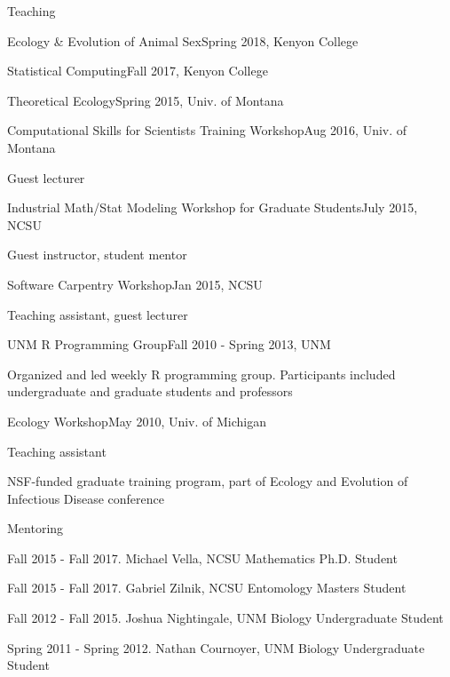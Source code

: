 \documentclass{resume} %
\begin{document}
\begin{rSection}{Teaching}
\begin{rSubsection}{Ecology \& Evolution of Animal Sex}{Spring 2018, Kenyon College}{}{}
\nullitem
\end{rSubsection}
\begin{rSubsection}{Statistical Computing}{Fall 2017, Kenyon College}{}{}
\nullitem
\end{rSubsection}
\begin{rSubsection}{Theoretical Ecology}{Spring 2015, Univ. of Montana}{}{}
\nullitem
\end{rSubsection}
\begin{rSubsection}{Computational Skills for Scientists Training Workshop}{Aug 2016, Univ. of Montana}{}{}
\item Guest lecturer
\end{rSubsection}
\begin{rSubsection}{Industrial Math/Stat Modeling Workshop for Graduate Students}{July 2015, NCSU}{}{}
\item Guest instructor, student mentor
\end{rSubsection}
\begin{rSubsection}{Software Carpentry Workshop}{Jan 2015, NCSU}{}{}
\item Teaching assistant, guest lecturer
\end{rSubsection}
\begin{rSubsection}{UNM R Programming Group}{Fall 2010 - Spring 2013, UNM}{}{}
\item Organized and led weekly R programming group. Participants included undergraduate and graduate students and professors
\end{rSubsection}
\begin{rSubsection}{Ecology Workshop}{May 2010, Univ. of Michigan}{}{}
\item Teaching assistant
\item NSF-funded graduate training program, part of Ecology and Evolution of Infectious
Disease conference
\end{rSubsection}
\end{rSection}

\begin{rSection}{Mentoring}
\item Fall 2015 - Fall 2017. Michael Vella, NCSU Mathematics Ph.D. Student
\item Fall 2015 - Fall 2017. Gabriel Zilnik, NCSU Entomology Masters Student
\item Fall 2012 - Fall 2015. Joshua Nightingale, UNM Biology Undergraduate Student
\item Spring 2011 - Spring 2012. Nathan Cournoyer, UNM Biology Undergraduate Student
\end{rSection}
\end{document}
